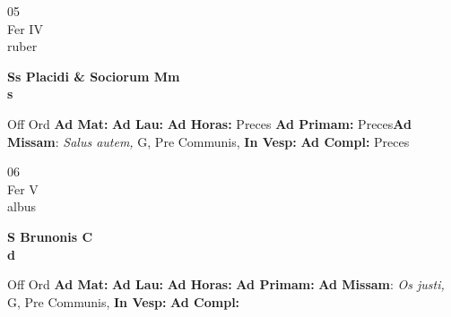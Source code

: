 \documentclass[10pt, openany]{book}
\begin{document}
    \begin{center}
        \begin{minipage}{3.5in}
            \vspace{2em}
            \begin{minipage}{0.5in}
                {\Huge 05} \\
                {\normalsize Fer IV} \\
                {\normalsize ruber}
            \end{minipage}
            \begin{minipage}{3.0in}
                \textbf{ \large Ss Placidi \& Sociorum Mm \\
                \textnormal{\normalsize s}} \\ 
            \end{minipage}
            \begin{justify}Off Ord
                \textbf{Ad Mat: }
                \textbf{Ad Lau: }
                \textbf{Ad Horas: }Preces
                \textbf{Ad Primam: }Preces\textbf{Ad Missam}: \textit{Salus autem,} G, Pre Communis,  
                \textbf{In Vesp: }
                \textbf{Ad Compl: }Preces
            \end{justify}
        \end{minipage}
    \end{center}

    \begin{center}
        \begin{minipage}{3.5in}
            \vspace{2em}
            \begin{minipage}{0.5in}
                {\Huge 06} \\
                {\normalsize Fer V} \\
                {\normalsize albus}
            \end{minipage}
            \begin{minipage}{3.0in}
                \textbf{ \large S Brunonis C \\
                \textnormal{\normalsize d}} \\ 
            \end{minipage}
            \begin{justify}Off Ord
                \textbf{Ad Mat: }
                \textbf{Ad Lau: }
                \textbf{Ad Horas: }
                \textbf{Ad Primam: }\textbf{Ad Missam}: \textit{Os justi,} G, Pre Communis,  
                \textbf{In Vesp: }
                \textbf{Ad Compl: }
            \end{justify}
        \end{minipage}
    \end{center}
\end{document}
